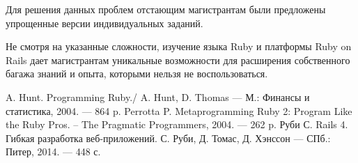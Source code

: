 \documentclass[10pt, a5paper]{article}
\begin{document}
Для решения данных проблем отстающим магистрантам были предложены упрощенные версии индивидуальных заданий.

Не смотря на указанные сложности, изучение языка Ruby и платформы Ruby on Rails дает магистрантам уникальные возможности для расширения собственного багажа знаний и  опыта, которыми нельзя не воспользоваться.



\begin{thebibliography}{9}
 A. Hunt. Programming Ruby./ A. Hunt, D. Thomas --- М.: Финансы и статистика, 2004. --- 864 p.
 Perrotta P. Metaprogramming Ruby 2: Program Like the Ruby Pros. -- The Pragmatic Programmers, 2004. --- 262 p.
 Руби С. Rails 4. Гибкая разработка веб-приложений. С. Руби, Д. Томас, Д. Хэнссон --- СПб.: Питер, 2014. --- 448 с.
\end{thebibliography}
\end{document}
